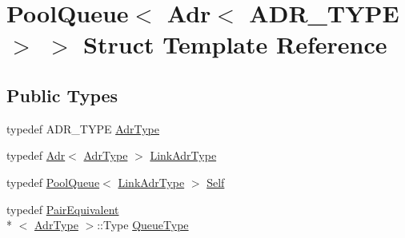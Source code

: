 \hypertarget{structPoolQueue_3_01Adr_3_01ADR__TYPE_01_4_01_4}{\section{Pool\-Queue$<$ Adr$<$ A\-D\-R\-\_\-\-T\-Y\-P\-E $>$ $>$ Struct Template Reference}
\label{structPoolQueue_3_01Adr_3_01ADR__TYPE_01_4_01_4}
}
\subsection*{Public Types}
\begin{DoxyCompactItemize}
\item 
typedef A\-D\-R\-\_\-\-T\-Y\-P\-E \hyperlink{structPoolQueue_3_01Adr_3_01ADR__TYPE_01_4_01_4_a064c3ab93d00612f59153ae3e22f8cce}{Adr\-Type}
\item 
typedef \hyperlink{structAdr}{Adr}$<$ \hyperlink{structPoolQueue_3_01Adr_3_01ADR__TYPE_01_4_01_4_a064c3ab93d00612f59153ae3e22f8cce}{Adr\-Type} $>$ \hyperlink{structPoolQueue_3_01Adr_3_01ADR__TYPE_01_4_01_4_a0186dae81484804c84ead6583955fe6c}{Link\-Adr\-Type}
\item 
typedef \hyperlink{structPoolQueue}{Pool\-Queue}$<$ \hyperlink{structPoolQueue_3_01Adr_3_01ADR__TYPE_01_4_01_4_a0186dae81484804c84ead6583955fe6c}{Link\-Adr\-Type} $>$ \hyperlink{structPoolQueue_3_01Adr_3_01ADR__TYPE_01_4_01_4_a93fe6b86d79f9e652e155b9431473418}{Self}
\item 
typedef \hyperlink{structPairEquivalent}{Pair\-Equivalent}\\*
$<$ \hyperlink{structPoolQueue_3_01Adr_3_01ADR__TYPE_01_4_01_4_a064c3ab93d00612f59153ae3e22f8cce}{Adr\-Type} $>$\-::Type \hyperlink{structPoolQueue_3_01Adr_3_01ADR__TYPE_01_4_01_4_af405a8f20e7744630ddff4f0dd7a215a}{Queue\-Type}
\end{DoxyCompactItemize}
